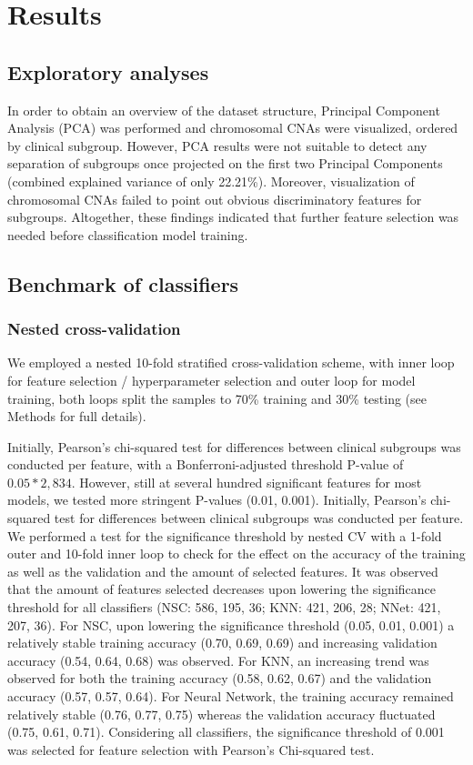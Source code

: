 \section{Results}

\subsection{Exploratory analyses}
In order to obtain an overview of the dataset structure, Principal Component Analysis (PCA) was performed and chromosomal CNAs were visualized, ordered by clinical subgroup. However, PCA results were not suitable to detect any separation of subgroups once projected on the first two Principal Components (combined explained variance of only 22.21\%). Moreover, visualization of chromosomal CNAs failed to point out obvious discriminatory features for subgroups. Altogether, these findings indicated that further feature selection was needed before classification model training.

\subsection{Benchmark of classifiers}
    \subsubsection{Nested cross-validation}
        We employed a nested 10-fold stratified cross-validation scheme, with inner loop for feature selection / hyperparameter selection and outer loop for model training, both loops split the samples to 70\% training and 30\% testing (see Methods for full details).
        
        Initially, Pearson's chi-squared test for differences between clinical subgroups was conducted per feature, with a Bonferroni-adjusted threshold P-value of $0.05 * 2,834$. However, still at several hundred significant features for most models, we tested more stringent P-values (0.01, 0.001). 
        Initially, Pearson's chi-squared test for differences between clinical subgroups was conducted per feature. We performed a test for the significance threshold by nested CV with a 1-fold outer and 10-fold inner loop to check for the effect on the accuracy of the training as well as the validation and the amount of selected features. It was observed that the amount of features selected decreases upon lowering the significance threshold for all classifiers (NSC: 586, 195, 36; KNN: 421, 206, 28; NNet: 421, 207, 36). For NSC, upon lowering the significance threshold (0.05, 0.01, 0.001) a relatively stable training accuracy (0.70, 0.69, 0.69) and increasing validation accuracy (0.54, 0.64, 0.68) was observed. For KNN, an increasing trend was observed for both the training accuracy (0.58, 0.62, 0.67) and the validation accuracy (0.57, 0.57, 0.64). For Neural Network, the training accuracy remained relatively stable (0.76, 0.77, 0.75) whereas the validation accuracy fluctuated (0.75, 0.61, 0.71). Considering all classifiers, the significance threshold of 0.001 was selected for feature selection with Pearson's Chi-squared test.
    
